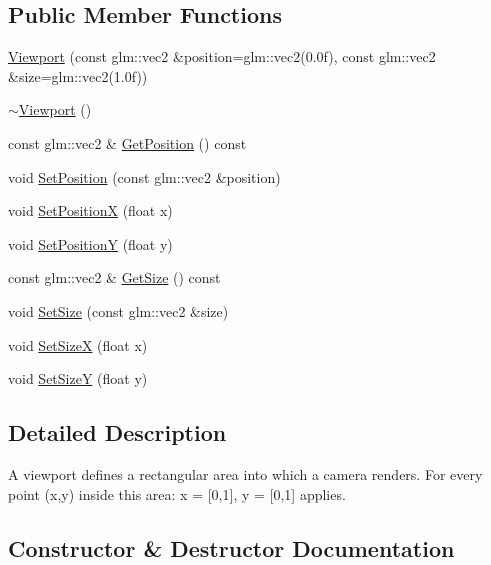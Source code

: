 \subsection*{Public Member Functions}
\begin{DoxyCompactItemize}
\item 
\mbox{\hyperlink{classec_1_1_viewport_a287d09d9303d9fbbea3c915f832d2ab8}{Viewport}} (const glm\+::vec2 \&position=glm\+::vec2(0.\+0f), const glm\+::vec2 \&size=glm\+::vec2(1.\+0f))
\item 
\mbox{\hyperlink{classec_1_1_viewport_a65341c63372c6158a0a2932fa1f2c66b}{$\sim$\+Viewport}} ()
\item 
const glm\+::vec2 \& \mbox{\hyperlink{classec_1_1_viewport_aee8a504b5b66702a627cc13aa3e4ac94}{Get\+Position}} () const
\item 
void \mbox{\hyperlink{classec_1_1_viewport_a880a53af6b1b80bd30dec3da38e4a653}{Set\+Position}} (const glm\+::vec2 \&position)
\item 
void \mbox{\hyperlink{classec_1_1_viewport_a02f3a376956b1f7234efcaa26bedf064}{Set\+PositionX}} (float x)
\item 
void \mbox{\hyperlink{classec_1_1_viewport_abe18d636e8f53f087b3cb7a21699fb93}{Set\+PositionY}} (float y)
\item 
const glm\+::vec2 \& \mbox{\hyperlink{classec_1_1_viewport_a128183b59733fcef73d52a9f61f82181}{Get\+Size}} () const
\item 
void \mbox{\hyperlink{classec_1_1_viewport_a9e8bd48f0bb12b8a45502d766d6e1b76}{Set\+Size}} (const glm\+::vec2 \&size)
\item 
void \mbox{\hyperlink{classec_1_1_viewport_a8bee5a207bb2919c04624aa7b9d3af34}{Set\+SizeX}} (float x)
\item 
void \mbox{\hyperlink{classec_1_1_viewport_aca8b10d6c70358e579980c7a32efd21c}{Set\+SizeY}} (float y)
\end{DoxyCompactItemize}


\subsection{Detailed Description}
A viewport defines a rectangular area into which a camera renders. For every point (x,y) inside this area\+: x = \mbox{[}0,1\mbox{]}, y = \mbox{[}0,1\mbox{]} applies. 

\subsection{Constructor \& Destructor Documentation}
\mbox{\label{classec_1_1_viewport_a287d09d9303d9fbbea3c915f832d2ab8}} 

